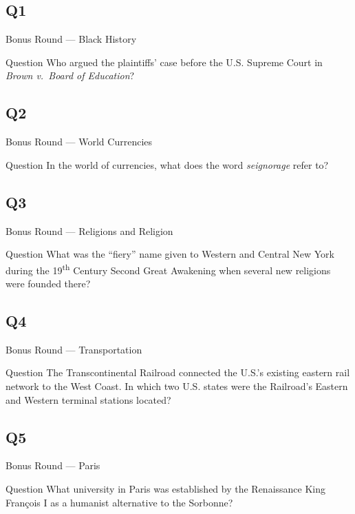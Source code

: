 \documentclass[11pt]{beamer}
\begin{document}
\subsection*{Q1}
\begin{frame}[t]{Bonus Round --- Black History}
\vspace{-0.5em}
\begin{block}{Question}
Who argued the plaintiffs' case before the U.S. Supreme Court in \emph{Brown v.\ Board of Education}?
\end{block}
\end{frame}
\subsection*{Q2}
\begin{frame}[t]{Bonus Round --- World Currencies}
\vspace{-0.5em}
\begin{block}{Question}
In the world of currencies, what does the word \emph{seignorage} refer to?
\end{block}
\end{frame}
\subsection*{Q3}
\begin{frame}[t]{Bonus Round --- Religions and Religion}
\vspace{-0.5em}
\begin{block}{Question}
What was the ``fiery'' name given to Western and Central New York during the 19\textsuperscript{th} Century Second Great Awakening when several new religions were founded there?
\end{block}
\end{frame}
\subsection*{Q4}
\begin{frame}[t]{Bonus Round --- Transportation}
\vspace{-0.5em}
\begin{block}{Question}
The Transcontinental Railroad connected the U.S.'s existing eastern rail network to the West Coast. In which two U.S. states were the Railroad's Eastern and Western terminal stations located?
\end{block}
\end{frame}
\subsection*{Q5}
\begin{frame}[t]{Bonus Round --- Paris}
\vspace{-0.5em}
\begin{block}{Question}
What university in Paris was established by the  Renaissance King  Fran\c{c}ois I as a humanist alternative to the Sorbonne?
\end{block}
\end{frame}
\end{document}
